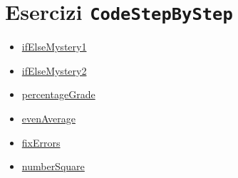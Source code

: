 \documentclass{article}
\begin{document}
\section*{Esercizi \texttt{CodeStepByStep}}
\begin{itemize}
	\item \href{https://www.codestepbystep.com/problem/view/cpp/ifelse/ifElseMystery1}{ifElseMystery1}
	\item \href{https://www.codestepbystep.com/problem/view/cpp/ifelse/ifElseMystery2}{ifElseMystery2}
	\item \href{https://www.codestepbystep.com/problem/view/cpp/ifelse/percentageGrade}{percentageGrade}
	\item \href{https://www.codestepbystep.com/problem/view/cpp/basics/evenAverage}{evenAverage}
	\item \href{https://www.codestepbystep.com/problem/view/cpp/basics/fixErrors}{fixErrors}
	\item \href{https://www.codestepbystep.com/problem/view/cpp/basics/numberSquare}{numberSquare}
\end{itemize}
\end{document}

